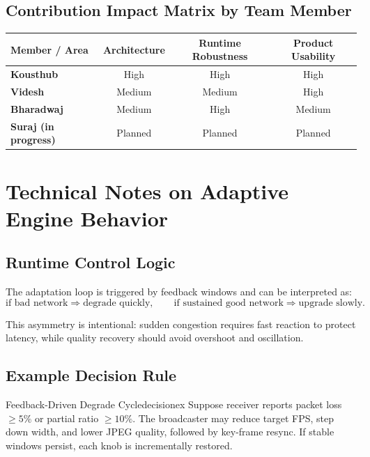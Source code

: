 \documentclass[12pt,a4paper]{article}
\begin{document}
\subsection{Contribution Impact Matrix by Team Member}
\begin{center}
\renewcommand{\arraystretch}{1.35}
\begin{tabular}{>{\bfseries}l|c|c|c}
\toprule
Member / Area & Architecture & Runtime Robustness & Product Usability \\
\midrule
Kousthub & High & High & High \\
Videsh & Medium & Medium & High \\
Bharadwaj & Medium & High & Medium \\
Suraj (in progress) & Planned & Planned & Planned \\
\bottomrule
\end{tabular}
\end{center}

\newpage

\section{Technical Notes on Adaptive Engine Behavior}

\subsection{Runtime Control Logic}
The adaptation loop is triggered by feedback windows and can be interpreted as:
\[
\text{if bad network} \Rightarrow \text{degrade quickly}, \qquad
\text{if sustained good network} \Rightarrow \text{upgrade slowly}.
\]

This asymmetry is intentional: sudden congestion requires fast reaction to protect latency, while quality recovery should avoid overshoot and oscillation.

\subsection{Example Decision Rule}
\begin{example}{Feedback-Driven Degrade Cycle}{decisionex}
Suppose receiver reports packet loss \(\geq 5\%\) or partial ratio \(\geq 10\%\). The broadcaster may reduce target FPS, step down width, and lower JPEG quality, followed by key-frame resync. If stable windows persist, each knob is incrementally restored.
\end{example}
\end{document}

